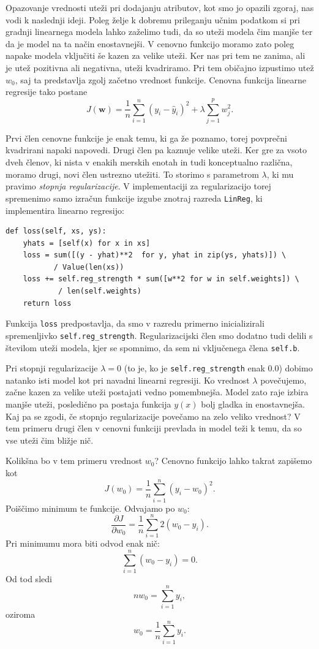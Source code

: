 Opazovanje vrednosti uteži pri dodajanju atributov, kot smo jo opazili zgoraj, nas vodi k naslednji ideji. Poleg želje k dobremu prileganju učnim podatkom si pri gradnji linearnega modela lahko zaželimo tudi, da so uteži modela čim manjše ter da je model na ta način enostavnejši. V cenovno funkcijo moramo zato poleg napake modela vključiti še kazen za velike uteži. Ker nas pri tem ne zanima, ali je utež pozitivna ali negativna, uteži kvadriramo. Pri tem običajno izpustimo utež $w_0$, saj ta predstavlja zgolj začetno vrednost funkcije. Cenovna funkcija linearne regresije tako postane
%
\[
J(\mathbf{w}) =
\frac{1}{n} \sum_{i=1}^{n} (y_i - \hat{y}_i)^2
+
\lambda \sum_{j=1}^{p} w_j^2 .
\]

Prvi člen cenovne funkcije je enak temu, ki ga že poznamo, torej povprečni kvadrirani napaki napovedi. Drugi člen pa kaznuje  velike uteži. Ker gre za vsoto dveh členov, ki nista v enakih merskih enotah in tudi konceptualno različna, moramo drugi, novi člen ustrezno utežiti. To storimo s parametrom $\lambda$, ki mu pravimo \emph{stopnja regularizacije}. V implementaciji za regularizacijo torej spremenimo samo izračun funkcije izgube znotraj razreda \texttt{LinReg}, ki implementira linearno regresijo:

\vspace*{3mm}
\begin{lstlisting}
def loss(self, xs, ys):
    yhats = [self(x) for x in xs]
	loss = sum([(y - yhat)**2  for y, yhat in zip(ys, yhats)]) \
	       / Value(len(xs))
    loss += self.reg_strength * sum([w**2 for w in self.weights]) \
            / len(self.weights)
    return loss
\end{lstlisting}
%
Funkcija \texttt{loss} predpostavlja, da smo v razredu primerno inicializirali spremenljivko \texttt{self.reg\_strength}. Regularizacijski člen smo dodatno tudi delili s številom uteži modela, kjer se spomnimo, da sem ni vključenega člena \texttt{self.b}.

Pri stopnji regularizacije $\lambda = 0$ (to je, ko je \texttt{self.reg\_strength} enak 0.0) dobimo natanko isti model kot pri navadni linearni regresiji. Ko vrednost $\lambda$ povečujemo, začne kazen za velike uteži postajati vedno pomembnejša. Model zato raje izbira manjše uteži, posledično pa postaja funkcija $y(x)$ bolj gladka in enostavnejša. Kaj pa se zgodi, če stopnjo regularizacije povečamo na zelo veliko vrednost? V tem primeru drugi člen v cenovni funkciji prevlada in model teži k temu, da so vse uteži čim bližje nič. 

Kolikšna bo v tem primeru vrednost $w_0$? Cenovno funkcijo lahko takrat zapišemo kot
%
\[
J(w_0) = \frac{1}{n} \sum_{i=1}^{n} (y_i - w_0)^2 .
\]
%
Poiščimo minimum te funkcije. Odvajamo po $w_0$:
%
\[
\frac{\partial J}{\partial w_0}
=
\frac{1}{n} \sum_{i=1}^{n} 2(w_0 - y_i).
\]
%
Pri minimumu mora biti odvod enak nič:
%
\[
\sum_{i=1}^{n} (w_0 - y_i) = 0 .
\]
%
Od tod sledi
%
\[
n w_0 = \sum_{i=1}^{n} y_i ,
\]
%
oziroma
%
\[
w_0 = \frac{1}{n} \sum_{i=1}^{n} y_i .
\]

